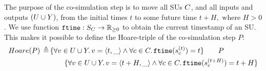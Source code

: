 The purpose of the co-simulation step is to move all SUs $C$, and all inputs and outputs $(U \cup Y)$, from the initial times $t$ to some future time $t+H, \textrm{ where } H > 0$. We use function $\mathtt{ftime}: S_{C} \to \mathbb{R}_{\geq 0}$ to obtain the current timestamp of an SU.
This makes it possible to define the Hoare-triple of the co-simulation step $P$:
\begin{align*}
  Hoare(P) \,\triangleq\, &\{\forall v \in U \cup Y \ldotp v =  \left\langle t, \_ \right\rangle  \land \forall c \in C \ldotp \mathtt{ftime}(s_{c}^{(t)}) = t\} \qquad  P \\
  & \qquad \{\forall v \in U \cup Y \ldotp v =  \left\langle t+H, \_ \right\rangle  \land \forall c \in C \ldotp \mathtt{ftime}(s_{c}^{(t+H)}) = t+H \}
\end{align*}

